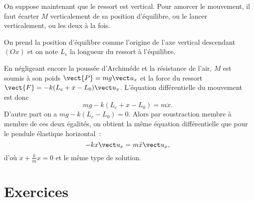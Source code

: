 On suppose maintenant que le ressort est vertical. Pour amorcer le mouvement, il faut écarter $M$ verticalement de sa position d'équilibre, ou le lancer verticalement, ou les deux à la fois.

On prend la position d'équilibre comme l'origine de l'axe vertical descendant $(Ox)$ et on note $L_e$ la longueur du ressort à l'équilibre.

En négligeant encore la poussée d'Archiméde et la résistance de l'air, $M$ est soumis à son poids $\vect{P}=mg\ux$ et la force du ressort $\vect{F}=-k(L_e +x-L_0)\ux$. 
L'équation différentielle du mouvement est donc
\begin{equation}
  mg -k(L_e +x-L_0) = m\ddot{x}.
\end{equation}
D'autre part on a $ mg -k(L_e-L_0)=0$. Alors par soustraction membre à membre de ces deux égalités, on obtient la même équation différentielle que pour le pendule élastique horizontal~:
\begin{equation}
  -kx \ux = m \ddot{x} \ux,
\end{equation}
d'où $\ddot{x} +\frac{k}{m}x=0$ et le même type de solution.

\section{Exercices}
\label{chap3-sec:exercices}

